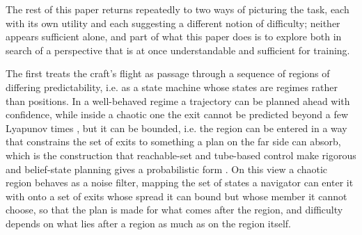 \documentclass[11pt]{article}
\begin{document}
The rest of this paper returns repeatedly to two ways of picturing the
task, each with its own utility and each suggesting a different notion of
difficulty; neither appears sufficient alone, and part of what this paper
does is to explore both in search of a perspective that is at once
understandable and sufficient for training.

The first treats the craft's flight as passage through a sequence of regions
of differing predictability, i.e. as a state machine whose states are
regimes rather than positions. In a well-behaved regime a trajectory can be
planned ahead with confidence, while inside a chaotic one the exit cannot be
predicted beyond a few Lyapunov times \cite{lorenz1963,grebogi1983}, but it
can be bounded, i.e. the region can be entered in a way that constrains the
set of exits to something a plan on the far side can absorb, which is the
construction that reachable-set and tube-based control make rigorous
\cite{mitchell2005,mayne2005} and belief-state planning gives a
probabilistic form \cite{kaelbling1998}. On this view a chaotic region
behaves as a noise filter, mapping the set of states a navigator can enter
it with onto a set of exits whose spread it can bound but whose member it
cannot choose, so that the plan is made for what comes after the region,
and difficulty depends on what lies after a region as much as on the
region itself.
\end{document}

